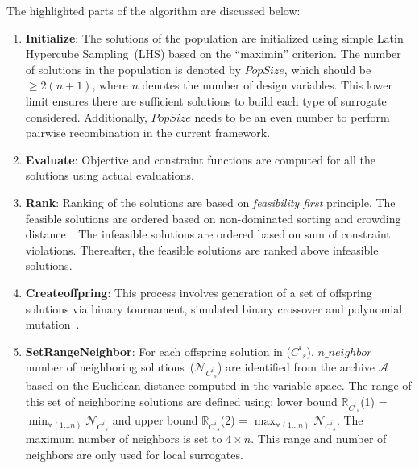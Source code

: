 \begin{algorithm}[!htb]
\begin{algorithmic}[1]
	\end{algorithmic}
	\label{alg:SAMO}
\end{algorithm}

The highlighted parts of the algorithm are discussed below:\\
\begin{enumerate}
	\item \textbf{Initialize}: The solutions of the population are initialized using simple Latin Hypercube Sampling~(LHS) based on the ``maximin'' criterion. The number of solutions in the population is denoted by $PopSize$, which should be $\geq 2(n+1)$, where $n$ denotes the number of design variables. This lower limit ensures there are sufficient solutions to build each type of surrogate considered. Additionally, $PopSize$ needs to be an even number to perform pairwise recombination in the current framework.
	\item \textbf{Evaluate}: Objective and constraint functions are computed for all the solutions using actual evaluations.
	\item \textbf{Rank}: Ranking of the solutions are based on \textit{feasibility first} principle. The feasible solutions are ordered based on non-dominated sorting and crowding distance~\cite{deb2002fae}. The infeasible solutions are ordered based on sum of constraint violations. Thereafter, the feasible solutions are ranked above infeasible solutions.
	\item \textbf{Createoffpring}: This process involves generation of a set of offspring solutions via binary tournament, simulated binary crossover and polynomial mutation~\cite{deb2002fae}.  
	\item \textbf{SetRangeNeighbor}: For each offspring solution in (${C^{i}}_s$), $n\_neighbor$ number of neighboring solutions~($\mathcal{N}_{{C^{i}}_s}$) are identified from the archive $\mathcal{A}$ based on the Euclidean distance computed in the variable space. The range of this set of neighboring solutions are defined using: lower bound $\mathbb{R}_{{C^{i}}_s}$(1) = $\min_{\forall (1\dots n)} \mathcal{N}_{{C^{i}}_s}$ and upper bound $\mathbb{R}_{{C^{i}}_s}$(2) = $\max_{\forall (1\dots n)} \mathcal{N}_{{C^{i}}_s}$. The maximum number of neighbors is set to $4 \times n$. This range and number of neighbors are only used for local surrogates.

\end{enumerate}

